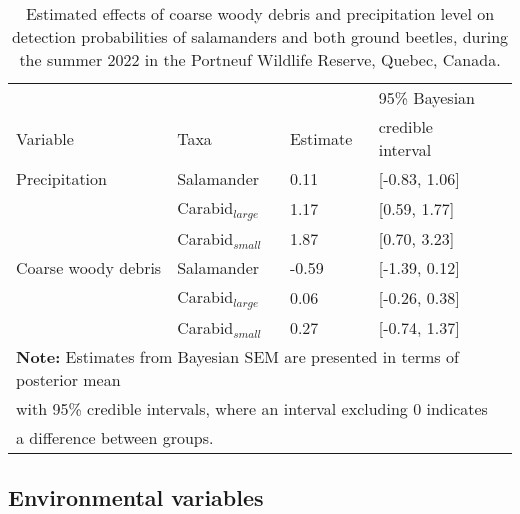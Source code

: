 \begin{table}[ht]
  \centering
  \caption[Estimated effects of coarse woody debris and precipitation level on detection probabilities of salamanders and both ground beetles.]
  {Estimated effects of coarse woody debris and precipitation level on detection probabilities of salamanders and both ground beetles, during the summer 2022 in the Portneuf Wildlife Reserve,  Quebec, Canada.}
  \label{tab:detection}
  \begin{tabular}{lllll} 
      \hline
      &&&95\% Bayesian \\
      Variable & Taxa & Estimate &  credible interval \\ [0.5ex] 
      \hline      
      Precipitation       & Salamander              & \hspace{1mm}0.11 & [-0.83, 1.06] \\ 
                          & Carabid$_{large}$  & \hspace{1mm}1.17 & [0.59, 1.77] \\ 
                          & Carabid$_{small}$        & \hspace{1mm}1.87 & [0.70, 3.23] \\  
      \hline      
      Coarse woody debris & Salamander              & -0.59 & [-1.39, 0.12] \\ 
                          & Carabid$_{large}$  & \hspace{1mm}0.06 & [-0.26, 0.38] \\ 
                          & Carabid$_{small}$        & \hspace{1mm}0.27 & [-0.74, 1.37] \\   

      \hline
      \multicolumn{4}{l}{\textbf{Note:} Estimates from Bayesian SEM are presented in terms of posterior mean} \\
      \multicolumn{4}{l}{with 95\% credible intervals, where an interval excluding 0 indicates} \\
      \multicolumn{4}{l}{a difference between groups.} \\
  \end{tabular}
\end{table}


\subsection*{Environmental variables}
\label{subsec:ResEnv}

